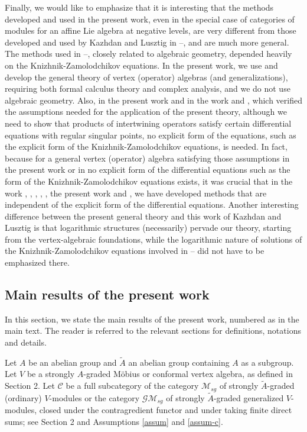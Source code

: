 \documentclass[12pt]{article}
\begin{document}
Finally, we would like to emphasize that it is interesting that the
methods developed and used in the present work, even in the special
case of categories of modules for an affine Lie algebra at negative
levels, are very different from those developed and used by Kazhdan
and Lusztig in \cite{KL1}--\cite{KL5}, and are much more general.  The
methods used in \cite{KL1}--\cite{KL5}, closely related to algebraic
geometry, depended heavily on the Knizhnik-Zamolodchikov equations.
In the present work, we use and develop the general theory of vertex
(operator) algebras (and generalizations), requiring both formal
calculus theory and complex analysis, and we do not use algebraic
geometry. Also, in the present work and in the work \cite{Z1} and
\cite{Z2}, which verified the assumptions needed for the application
of the present theory, although we need to show that products of
intertwining operators satisfy certain differential equations with
regular singular points, no explicit form of the equations, such as
the explicit form of the Knizhnik-Zamolodchikov equations, is
needed. In fact, because for a general vertex (operator) algebra
satisfying those assumptions in the present work or in \cite{H13} no
explicit form of the differential equations such as the form of the
Knizhnik-Zamolodchikov equations exists, it was crucial that in the
work \cite{tensor1}, \cite{tensor2}, \cite{tensor3}, \cite{tensor4},
\cite{diff-eqn}, the present work and \cite{H13}, we have developed
methods that are independent of the explicit form of the differential
equations.  Another interesting difference between the present general
theory and this work of Kazhdan and Lusztig is that logarithmic
structures (necessarily) pervade our theory, starting from the
vertex-algebraic foundations, while the logarithmic nature of
solutions of the Knizhnik-Zamolodchikov equations involved in
\cite{KL1}--\cite{KL5} did not have to be emphasized there.

\subsection{Main results of the present work}

In this section, we state the main results of the present work,
numbered as in the main text.  The reader is referred to the relevant
sections for definitions, notations and details.

Let $A$ be an abelian group and $\tilde{A}$ an abelian group
containing $A$ as a subgroup. Let $V$ be a strongly $A$-graded
M\"{o}bius or conformal vertex algebra, as defined in Section 2.  Let
$\mathcal{C}$ be a full subcategory of the category $\mathcal{M}_{sg}$
of strongly $\tilde{A}$-graded (ordinary) $V$-modules or the category
$\mathcal{G}\mathcal{M}_{sg}$ of strongly $\tilde{A}$-graded
generalized $V$-modules, closed under the contragredient functor and
under taking finite direct sums; see Section 2 and Assumptions
\ref{assum} and \ref{assum-c}.
\end{document}
